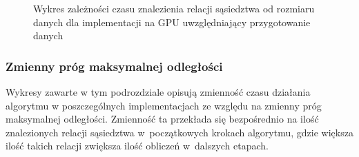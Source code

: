 \documentclass[12pt]{article}
\begin{document}
\begin{figure}[H]
\caption{Wykres zależności czasu znalezienia relacji sąsiedztwa od rozmiaru danych dla implementacji na GPU uwzględniający przygotowanie danych}
\label{chart:gpu-planesweep-data-preparation}
\end{figure}

\subsubsection{Zmienny próg maksymalnej odległości}

Wykresy zawarte w tym podrozdziale opisują zmienność czasu działania algorytmu w poszczególnych implementacjach ze względu na zmienny próg maksymalnej odległości. Zmienność ta przekłada się bezpośrednio na ilość znalezionych relacji sąsiedztwa w~początkowych krokach algorytmu, gdzie większa ilość takich relacji zwiększa ilość obliczeń w~dalszych etapach.
\end{document}
